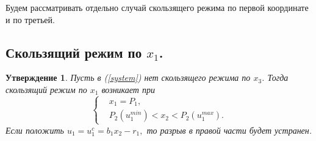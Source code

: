 \documentclass[11pt]{article}
\newtheorem{statement}{Утверждение}
\theoremstyle{definition}
\newcommand\Ref[1]{(\ref{#1})}
\newcommand\RS{\Ref{system} }
\begin{document}
	Будем рассматривать отдельно случай скользящего режима по первой координате и по третьей.

\subsection{Скользящий режим по $x_1$.}
\begin{statement}
	Пусть в \RS нет скользящего режима по $x_3$. Тогда скользящий режим по $x_1$ возникает при 
	$$
        	\left\{
        \begin{aligned}
        		&x_1 = P_1, \\
        		&P_2(u_1^{min}) < x_2 < P_2(u_1^{max}).
        \end{aligned}
        \right.
	$$
	Если положить $u_1 = u_1^c = b_1x_2 - r_1,$ то разрыв в правой части будет устранен.
\end{statement}
\end{document}
